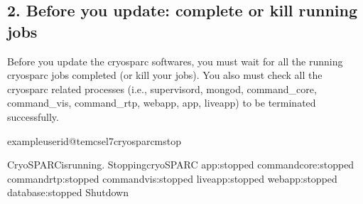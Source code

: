 \documentclass[a4paper,11pt,english]{sphinxmanual}
\begin{document}
\subsection{2. Before you update: complete or kill running jobs}
\label{\detokenize{faq:before-you-update-complete-or-kill-running-jobs}}
\sphinxAtStartPar
Before you update the cryosparc softwares, you must wait for all the running cryosparc jobs completed (or kill your jobs).
You also must check all the cryosparc related processes (i.e., supervisord, mongod, command\_core, command\_vis, command\_rtp, webapp, app, liveapp) to be terminated successfully.

\begin{sphinxVerbatim}[commandchars=\\\{\}]
exampleuserid@tem\PYGZhy{}cs\PYGZhy{}el7\PYGZdl{}\PYGZgt{}cryosparcmstop

CryoSPARCisrunning.
StoppingcryoSPARC
app:stopped
command\PYGZus{}core:stopped
command\PYGZus{}rtp:stopped
command\PYGZus{}vis:stopped
liveapp:stopped
webapp:stopped
database:stopped
Shutdown


\end{sphinxVerbatim}
\end{document}
